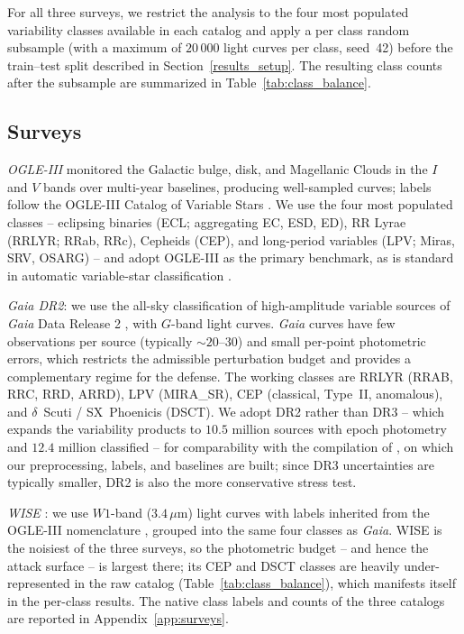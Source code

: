 \documentclass{aa}
\begin{document}
For all three surveys, we restrict the analysis to the four most populated variability classes available in each catalog and apply a per class random subsample (with a maximum of $20\,000$ light curves per class, seed~42) before the train--test split described in Section~\ref{results_setup}. The resulting class counts after the subsample are summarized in Table~\ref{tab:class_balance}.

\subsection{Surveys}

\emph{OGLE-III} \citep{udalski2004optical, udalski2008ogle} monitored the
Galactic bulge, disk, and Magellanic Clouds in the $I$ and $V$ bands over multi-year baselines, producing well-sampled curves; labels follow the OGLE-III Catalog of Variable Stars
\citep{soszynski2008cep, soszynski2009rrlyr, soszynski2009lpv,
poleski2010dsct, graczyk2011ecl}. We use the four most populated classes
-- eclipsing binaries (ECL; aggregating EC, ESD, ED), RR Lyrae (RRLYR;
RRab, RRc), Cepheids (CEP), and long-period variables (LPV; Miras, SRV,
OSARG) -- and adopt OGLE-III as the primary benchmark, as is standard in
automatic variable-star classification \citep{aguirre2019deep,
becker2020scalable, donoso2021effect, bassi2021classification}.

\emph{Gaia DR2}: we use the all-sky classification of high-amplitude
variable sources of \textit{Gaia} Data Release 2 \citep{gaia_mission,
gaia2018gaia, holl2018gaia, rimoldini2019gaia}, with $G$-band light
curves. \textit{Gaia} curves have few observations per source (typically
${\sim}20$--$30$) and small per-point photometric errors, which restricts
the admissible perturbation budget and provides a complementary regime
for the defense. The working classes are RRLYR (RRAB, RRC, RRD, ARRD),
LPV (MIRA\_SR), CEP (classical, Type~II, anomalous), and $\delta$~Scuti /
SX~Phoenicis (DSCT). We adopt DR2 rather than DR3 -- which expands the variability products to $10.5$ million sources with epoch photometry and $12.4$ million classified \citep{eyer2023gaia, rimoldini2023gaia} -- for comparability with the compilation of \citet{becker2020scalable}, on which our preprocessing, labels, and baselines are built; since DR3 uncertainties are typically smaller, DR2 is also the more conservative stress test.

\emph{WISE} \citep{wright2010wide}: we use $W1$-band ($3.4\,\mu$m) light
curves with labels inherited from the OGLE-III nomenclature
\citep{becker2020scalable}, grouped into the same four classes as
\textit{Gaia}. WISE is the noisiest of the three surveys, so the
photometric budget -- and hence the attack surface -- is largest there;
its CEP and DSCT classes are heavily under-represented in the raw catalog
(Table~\ref{tab:class_balance}), which manifests itself in the per-class
results. The native class labels and counts of the three catalogs are
reported in Appendix~\ref{app:surveys}.
\end{document}
